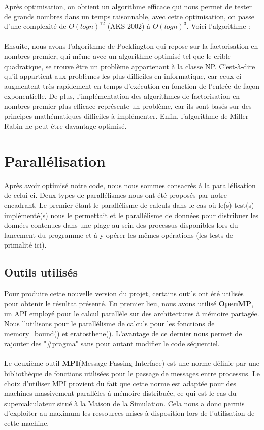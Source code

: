 Après optimisation, on obtient un algorithme efficace qui nous permet de tester de grands nombres dans un temps raisonnable, avec cette optimisation, on passe d'une complexité de $O (log n)^{12}$ (AKS 2002) à $O (log n)^3$. Voici l'algorithme :

	\paragraph{}Ensuite, nous avons l'algorithme de Pocklington qui repose sur la factorisation en nombres premier, qui même avec un algorithme optimisé tel que le crible quadratique, se trouve être un problème appartenant à la classe NP. C'est-à-dire qu'il appartient aux problèmes les plus difficiles en informatique, car ceux-ci augmentent très rapidement en temps d'exécution en fonction de l'entrée de façon exponentielle. De plus, l'implémentation des algorithmes de factorisation en nombres premier plus efficace représente un problème, car ils sont basés sur des principes mathématiques difficiles à implémenter. Enfin, l'algorithme de Miller-Rabin ne peut être davantage optimisé.
	

	\section{Parallélisation}
	Après avoir optimisé notre code, nous nous sommes consacrés à la parallélisation de celui-ci. Deux types de parallélismes nous ont été proposés par notre encadrant. Le premier étant le parallélisme de calculs dans le cas où le(s) test(s) implémenté(s) nous le permettait et le parallélisme de données pour distribuer les données contenues dans une plage au sein des processus disponibles lors du lancement du programme et à y opérer les mêmes opérations (les tests de primalité ici).

		\subsection{Outils utilisés}
Pour produire cette nouvelle version du projet, certains outils ont été utilisés pour obtenir le résultat présenté. En premier lieu, nous avons utilisé \textbf{OpenMP}\cite{omp}, un API employé pour le calcul parallèle sur des architectures à mémoire partagée. Nous l'utilisons pour le parallélisme de calculs pour les fonctions de memory\_bound() et eratosthene(). L'avantage de ce dernier nous permet de rajouter des "\#pragma" sans pour autant modifier le code séquentiel.

		\paragraph{}Le deuxième outil \textbf{MPI}(Message Passing Interface)\cite{MPI} est une norme définie par une bibliothèque de fonctions utilisées pour le passage de messages entre processus. Le choix d'utiliser MPI provient du fait que cette norme est adaptée pour des machines massivement parallèles à mémoire distribuée, ce qui est le cas du supercalculateur situé à la Maison de la Simulation. Cela nous a donc permis d'exploiter au maximum les ressources mises à disposition lors de l'utilisation de cette machine. 
		
